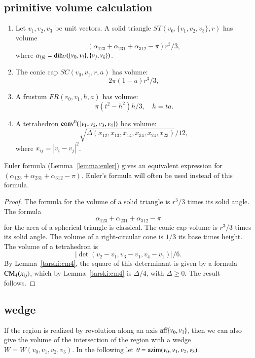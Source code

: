 \subsection{primitive volume calculation}

\begin{lemma} 
\begin{enumerate} 
 \item Let $v_1,v_2,v_3$ be unit vectors.
   A solid triangle $ST(v_0,\{v_1,v_2,v_3\},r)$ has volume
   $$
   (\alpha_{123}+\alpha_{231}+\alpha_{312}-\pi)r^3/3,
   $$
   where $\alpha_{ijk} = \operatorname{dih}_V(\{v_0,v_i\},\{v_j,v_k\})$.
  \item The conic cap $SC(v_0,v_1,r,a)$ has volume:
   $$
    2\pi(1-a) r^3/3,
   $$
 \item A frustum $FR(v_0,v_1,h,a)$ has volume:
   $$
   \pi (t^2-h^2) h/3,\quad h = t a.
   $$
 \item A tetrahedron ${\operatorname{conv}}^0(\{v_1,v_2,v_3,v_4\})$ has volume:
   $$
   \sqrt{\Delta(x_{12},x_{13},x_{14},x_{34},x_{24},x_{23})}/12,
   $$
   where $x_{ij} = |v_i-v_j|^2$.
\end{enumerate}
\end{lemma}

Euler formula (Lemma~\ref{lemma:euler}) gives an
equivalent expression for $(\alpha_{123}+\alpha_{231}+\alpha_{312}-\pi)$.
Euler's formula will often be used instead of this formula.

\begin{proof}
The formula for the volume of a solid triangle is $r^3/3$ times
its solid angle.  The formula 
   $$\alpha_{123}+\alpha_{231}+\alpha_{312}-\pi$$
for the area of a spherical triangle is classical.    
The conic cap volume is
$r^3/3$ times its solid angle.  
The volume of a right-circular cone is $1/3$ its base times height.
The volume of a tetrahedron is
   $$|\det(v_2-v_1,v_3-v_1,v_4-v_1)|/6.$$
By Lemma~\ref{tarski:cm4}, 
the square of this determinant is given by a formula
${\operatorname{CM}}_4(x_{ij})$, which by Lemma~\ref{tarski:cm4} is
$\Delta/4$, with $\Delta\ge0$.  The result follows.
\end{proof}



\subsection{wedge}

If the region is realized by revolution along an axis ${\operatorname{aff}}\{v_0,v_1\}$, 
then
we can also give the volume of the intersection of the region
with a wedge $W=W(v_0,v_1,v_2,v_3)$.
  In the following
let $\theta = {\operatorname{azim}}(v_0,v_1,v_2,v_3)$.

